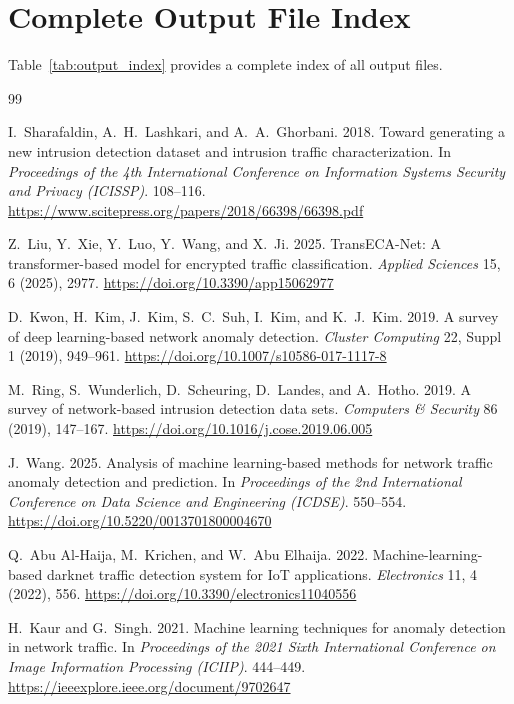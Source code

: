 \documentclass[sigconf]{acmart}
\begin{document}
\section{Complete Output File Index} Table~\ref{tab:output_index} provides a complete index of all output files.

\afterpage{\clearpage}
\begin{thebibliography}{99}

I.\ Sharafaldin, A.\ H.\ Lashkari, and A.\ A.\ Ghorbani. 2018. Toward generating a new intrusion detection dataset and intrusion traffic characterization. In \textit{Proceedings of the 4th International Conference on Information Systems Security and Privacy (ICISSP)}. 108--116. \url{https://www.scitepress.org/papers/2018/66398/66398.pdf}

Z.\ Liu, Y.\ Xie, Y.\ Luo, Y.\ Wang, and X.\ Ji. 2025. TransECA-Net: A transformer-based model for encrypted traffic classification. \textit{Applied Sciences} 15, 6 (2025), 2977. \url{https://doi.org/10.3390/app15062977}

D.\ Kwon, H.\ Kim, J.\ Kim, S.\ C.\ Suh, I.\ Kim, and K.\ J.\ Kim. 2019. A survey of deep learning-based network anomaly detection. \textit{Cluster Computing} 22, Suppl 1 (2019), 949--961. \url{https://doi.org/10.1007/s10586-017-1117-8}

M.\ Ring, S.\ Wunderlich, D.\ Scheuring, D.\ Landes, and A.\ Hotho. 2019. A survey of network-based intrusion detection data sets. \textit{Computers \& Security} 86 (2019), 147--167. \url{https://doi.org/10.1016/j.cose.2019.06.005}

J.\ Wang. 2025. Analysis of machine learning-based methods for network traffic anomaly detection and prediction. In \textit{Proceedings of the 2nd International Conference on Data Science and Engineering (ICDSE)}. 550--554. \url{https://doi.org/10.5220/0013701800004670}

Q.\ Abu Al-Haija, M.\ Krichen, and W.\ Abu Elhaija. 2022. Machine-learning-based darknet traffic detection system for IoT applications. \textit{Electronics} 11, 4 (2022), 556. \url{https://doi.org/10.3390/electronics11040556}

H.\ Kaur and G.\ Singh. 2021. Machine learning techniques for anomaly detection in network traffic. In \textit{Proceedings of the 2021 Sixth International Conference on Image Information Processing (ICIIP)}. 444--449. \url{https://ieeexplore.ieee.org/document/9702647}


\end{thebibliography}
\end{document}
